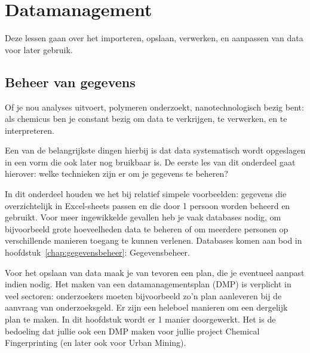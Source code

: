 \chapter{Datamanagement}
\label{chap:datamanagement}
Deze lessen gaan over het importeren, opslaan, verwerken, en aanpassen van data voor later gebruik.

\section{Beheer van gegevens}
Of je nou analyses uitvoert, polymeren onderzoekt, nanotechnologisch bezig bent: als chemicus ben je constant bezig om data te verkrijgen, te verwerken, en te interpreteren. 

Een van de belangrijkste dingen hierbij is dat data systematisch wordt opgeslagen in een vorm die ook later nog bruikbaar is. De eerste les van dit onderdeel gaat hierover: welke technieken zijn er om je gegevens te beheren?

In dit onderdeel houden we het bij relatief simpele voorbeelden: gegevens die overzichtelijk in Excel-sheets passen en die door 1 persoon worden beheerd en gebruikt. Voor meer ingewikkelde gevallen heb je vaak databases nodig, om bijvoorbeeld grote hoeveelheden data te beheren of om meerdere personen op verschillende manieren toegang te kunnen verlenen. Databases komen aan bod in hoofdstuk~\ref{chap:gegevensbeheer}: Gegevensbeheer.

Voor het opslaan van data maak je van tevoren een plan, die je eventueel aanpast indien nodig. Het maken van een datamanagementsplan (DMP) is verplicht in veel sectoren: onderzoekers moeten bijvoorbeeld zo'n plan aanleveren bij de aanvraag van onderzoeksgeld. Er zijn een heleboel manieren om een dergelijk plan te maken. In dit hoofdstuk wordt er 1 manier doorgewerkt. Het is de bedoeling dat jullie ook een DMP maken voor jullie project Chemical Fingerprinting (en later ook voor Urban Mining).

